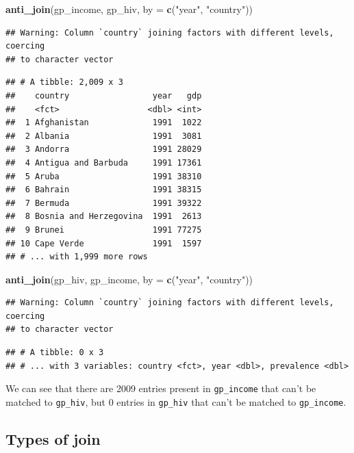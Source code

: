 \documentclass[]{book}
\newenvironment{Shaded}{\begin{snugshade}}{\end{snugshade}}
\newcommand{\KeywordTok}[1]{\textcolor[rgb]{0.13,0.29,0.53}{\textbf{{#1}}}}
\newcommand{\DataTypeTok}[1]{\textcolor[rgb]{0.13,0.29,0.53}{{#1}}}
\newcommand{\StringTok}[1]{\textcolor[rgb]{0.31,0.60,0.02}{{#1}}}
\newcommand{\NormalTok}[1]{{#1}}
\theoremstyle{definition}
\theoremstyle{definition}
\theoremstyle{definition}
\theoremstyle{remark}
\begin{document}
\begin{Shaded}
\begin{Highlighting}[]
\KeywordTok{anti_join}\NormalTok{(gp_income, gp_hiv, }\DataTypeTok{by =} \KeywordTok{c}\NormalTok{(}\StringTok{"year"}\NormalTok{, }\StringTok{"country"}\NormalTok{))}
\end{Highlighting}
\end{Shaded}

\begin{verbatim}
## Warning: Column `country` joining factors with different levels, coercing
## to character vector
\end{verbatim}

\begin{verbatim}
## # A tibble: 2,009 x 3
##    country                 year   gdp
##    <fct>                  <dbl> <int>
##  1 Afghanistan             1991  1022
##  2 Albania                 1991  3081
##  3 Andorra                 1991 28029
##  4 Antigua and Barbuda     1991 17361
##  5 Aruba                   1991 38310
##  6 Bahrain                 1991 38315
##  7 Bermuda                 1991 39322
##  8 Bosnia and Herzegovina  1991  2613
##  9 Brunei                  1991 77275
## 10 Cape Verde              1991  1597
## # ... with 1,999 more rows
\end{verbatim}

\begin{Shaded}
\begin{Highlighting}[]
\KeywordTok{anti_join}\NormalTok{(gp_hiv, gp_income, }\DataTypeTok{by =} \KeywordTok{c}\NormalTok{(}\StringTok{"year"}\NormalTok{, }\StringTok{"country"}\NormalTok{))}
\end{Highlighting}
\end{Shaded}

\begin{verbatim}
## Warning: Column `country` joining factors with different levels, coercing
## to character vector
\end{verbatim}

\begin{verbatim}
## # A tibble: 0 x 3
## # ... with 3 variables: country <fct>, year <dbl>, prevalence <dbl>
\end{verbatim}

We can see that there are 2009 entries present in \texttt{gp\_income}
that can't be matched to \texttt{gp\_hiv}, but 0 entries in
\texttt{gp\_hiv} that can't be matched to \texttt{gp\_income}.

\subsection{Types of join}\label{types-of-join}
\end{document}
